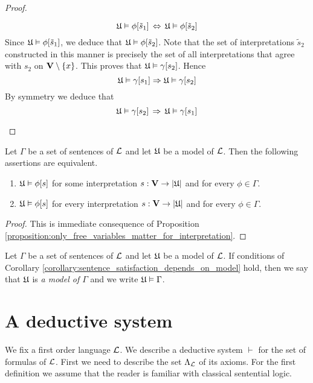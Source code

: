 \documentclass[10pt]{amsart}
\begin{document}
\begin{proof}
\begin{enumerate}[label=\textbf{(\arabic*)}, leftmargin=3.0em]
		      $${\mathfrak U} \vDash \phi[\tilde{s}_1] \,\Leftrightarrow\, {\mathfrak U} \vDash \phi[\tilde{s}_2]$$
		      Since ${\mathfrak U} \vDash \phi[\tilde{s}_1]$, we deduce that ${\mathfrak U} \vDash \phi[\tilde{s}_2]$. Note that the set of interpretations $\tilde{s}_2$ constructed in this manner is precisely the set of all interpretations that agree with $s_2$ on $\mathbf{V} \setminus \{x\}$. This proves that ${\mathfrak U} \vDash \gamma[s_2]$. Hence
		      $${\mathfrak U} \vDash \gamma[s_1] \Rightarrow {\mathfrak U} \vDash \gamma[s_2]$$
		      By symmetry we deduce that
		      $${\mathfrak U} \vDash \gamma[s_2] \,\Rightarrow\, {\mathfrak U} \vDash \gamma[s_1]$$
	\end{enumerate}
\end{proof}

\begin{corollary}\label{corollary:sentence_satisfaction_depends_on_model}
	Let $\Gamma$ be a set of sentences of ${\mathcal L}$ and let ${\mathfrak U}$ be a model of ${\mathcal L}$. Then the following assertions are
	equivalent.
	\begin{enumerate}[label=\emph{\textbf{(\roman*)}}, leftmargin=3.0em]
		\item ${\mathfrak U} \vDash \phi[s]$ for some interpretation $s:\mathbf{V}\rightarrow |{\mathfrak U}|$ and for every $\phi \in \Gamma$.
		\item ${\mathfrak U} \vDash \phi[s]$ for every interpretation $s:\mathbf{V}\rightarrow |{\mathfrak U}|$ and for every $\phi \in \Gamma$.
	\end{enumerate}
\end{corollary}
\begin{proof}
	This is immediate consequence of Proposition \ref{proposition:only_free_variables_matter_for_interpretation}.
\end{proof}

\begin{definition}
	Let $\Gamma$ be a set of sentences of ${\mathcal L}$ and let ${\mathfrak U}$ be a model of ${\mathcal L}$. If conditions of Corollary \ref{corollary:sentence_satisfaction_depends_on_model} hold, then we say that ${\mathfrak U}$ is \textit{a model of $\Gamma$} and we write ${\mathfrak U} \vDash \Gamma$.
\end{definition}

\section{A deductive system}
\noindent
We fix a first order language ${\mathcal L}$. We describe a deductive system $\vdash$ for the set of formulas of ${\mathcal L}$. First we need to describe the set $\Lambda_{\mathcal L}$ of its axioms. For the first definition we assume that the reader is familiar with classical sentential logic.
\end{document}
